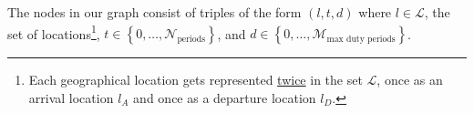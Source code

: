 The nodes in our graph consist of triples of the form $(l,t,d)$ where $l \in \mathcal{L}$, the set of locations\footnote{Each geographical location gets represented \underline{twice} in the set $\mathcal{L}$, once as an arrival location $l_A$ and once as a departure location $l_D$.}, $t \in \left\{ 0,\dots,\mathcal{N}_{\textrm{periods}}\right\}$, and $d \in \left\{0,\dots,\mathcal{M}_{\textrm{max duty periods}}\right\}$.